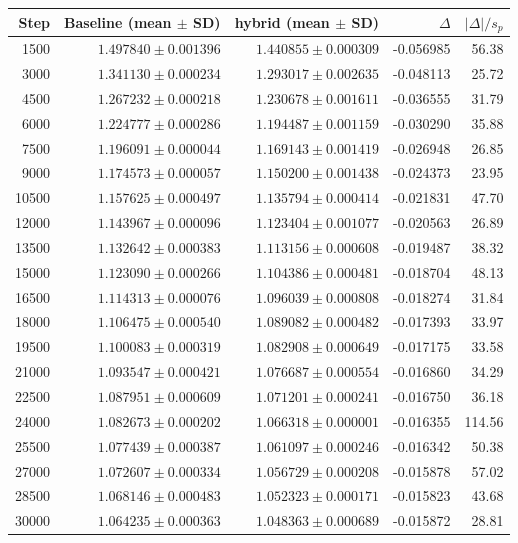 \begin{tabular}{rrrrr}
\hline
Step & Baseline (mean $\pm$ SD) & hybrid (mean $\pm$ SD) & $\Delta$ & $|\Delta|/s_p$ \\
\hline
1500 & $1.497840 \pm 0.001396$ & $1.440855 \pm 0.000309$ & -0.056985 & 56.38 \\
3000 & $1.341130 \pm 0.000234$ & $1.293017 \pm 0.002635$ & -0.048113 & 25.72 \\
4500 & $1.267232 \pm 0.000218$ & $1.230678 \pm 0.001611$ & -0.036555 & 31.79 \\
6000 & $1.224777 \pm 0.000286$ & $1.194487 \pm 0.001159$ & -0.030290 & 35.88 \\
7500 & $1.196091 \pm 0.000044$ & $1.169143 \pm 0.001419$ & -0.026948 & 26.85 \\
9000 & $1.174573 \pm 0.000057$ & $1.150200 \pm 0.001438$ & -0.024373 & 23.95 \\
10500 & $1.157625 \pm 0.000497$ & $1.135794 \pm 0.000414$ & -0.021831 & 47.70 \\
12000 & $1.143967 \pm 0.000096$ & $1.123404 \pm 0.001077$ & -0.020563 & 26.89 \\
13500 & $1.132642 \pm 0.000383$ & $1.113156 \pm 0.000608$ & -0.019487 & 38.32 \\
15000 & $1.123090 \pm 0.000266$ & $1.104386 \pm 0.000481$ & -0.018704 & 48.13 \\
16500 & $1.114313 \pm 0.000076$ & $1.096039 \pm 0.000808$ & -0.018274 & 31.84 \\
18000 & $1.106475 \pm 0.000540$ & $1.089082 \pm 0.000482$ & -0.017393 & 33.97 \\
19500 & $1.100083 \pm 0.000319$ & $1.082908 \pm 0.000649$ & -0.017175 & 33.58 \\
21000 & $1.093547 \pm 0.000421$ & $1.076687 \pm 0.000554$ & -0.016860 & 34.29 \\
22500 & $1.087951 \pm 0.000609$ & $1.071201 \pm 0.000241$ & -0.016750 & 36.18 \\
24000 & $1.082673 \pm 0.000202$ & $1.066318 \pm 0.000001$ & -0.016355 & 114.56 \\
25500 & $1.077439 \pm 0.000387$ & $1.061097 \pm 0.000246$ & -0.016342 & 50.38 \\
27000 & $1.072607 \pm 0.000334$ & $1.056729 \pm 0.000208$ & -0.015878 & 57.02 \\
28500 & $1.068146 \pm 0.000483$ & $1.052323 \pm 0.000171$ & -0.015823 & 43.68 \\
30000 & $1.064235 \pm 0.000363$ & $1.048363 \pm 0.000689$ & -0.015872 & 28.81 \\

\end{tabular}
